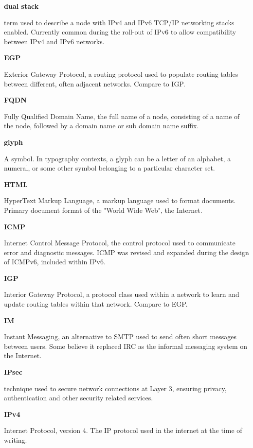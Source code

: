 \textbf{dual stack}

term used to describe a node with IPv4 and IPv6 TCP/IP networking stacks
enabled. Currently common during the roll-out of IPv6 to allow
compatibility between IPv4 and IPv6 networks.

\textbf{EGP}

Exterior Gateway Protocol, a routing protocol used to populate routing
tables between different, often adjacent networks. Compare to IGP.

\textbf{FQDN}

Fully Qualified Domain Name, the full name of a node, consisting of a
name of the node, followed by a domain name or sub domain name suffix.

\textbf{glyph}

A symbol. In typography contexts, a glyph can be a letter of an
alphabet, a numeral, or some other symbol belonging to a particular
character set.

\textbf{HTML}

HyperText Markup Language, a markup language used to format documents.
Primary document format of the "World Wide Web", the Internet.

\textbf{ICMP}

Internet Control Message Protocol, the control protocol used to
communicate error and diagnostic messages. ICMP was revised and expanded 
during the design of ICMPv6, included within IPv6.

\textbf{IGP}

Interior Gateway Protocol, a protocol class used within a network to
learn and update routing tables within that network. Compare to EGP.

\textbf{IM}

Instant Messaging, an alternative to SMTP used to send often short
messages between users. Some believe it replaced IRC as the informal
messaging system on the Internet. 

\textbf{IPsec}

technique used to secure network connections at Layer 3, ensuring
privacy, authentication and other security related services. 

\textbf{IPv4}

Internet Protocol, version 4. The IP protocol used in the internet
at the time of writing.

